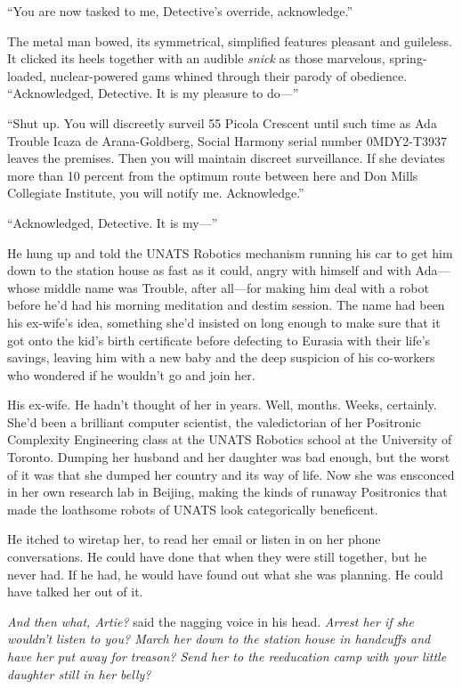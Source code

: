 “You are now tasked to me, Detective’s override, acknowledge.”

The metal man bowed, its symmetrical, simplified features pleasant
and guileless. It clicked its heels together with an audible
\emph{snick} as those marvelous, spring-loaded, nuclear-powered
gams whined through their parody of obedience. “Acknowledged,
Detective. It is my pleasure to do—”

“Shut up. You will discreetly surveil 55 Picola Crescent until such
time as Ada Trouble Icaza de Arana-Goldberg, Social Harmony serial
number 0MDY2-T3937 leaves the premises. Then you will maintain
discreet surveillance. If she deviates more than 10 percent from
the optimum route between here and Don Mills Collegiate Institute,
you will notify me. Acknowledge.”

“Acknowledged, Detective. It is my—”

He hung up and told the UNATS Robotics mechanism running his car to
get him down to the station house as fast as it could, angry with
himself and with Ada—whose middle name was Trouble, after all—for
making him deal with a robot before he’d had his morning meditation
and destim session. The name had been his ex-wife’s idea, something
she’d insisted on long enough to make sure that it got onto the
kid’s birth certificate before defecting to Eurasia with their
life’s savings, leaving him with a new baby and the deep suspicion
of his co-workers who wondered if he wouldn’t go and join her.

His ex-wife. He hadn’t thought of her in years. Well, months.
Weeks, certainly. She’d been a brilliant computer scientist, the
valedictorian of her Positronic Complexity Engineering class at the
UNATS Robotics school at the University of Toronto. Dumping her
husband and her daughter was bad enough, but the worst of it was
that she dumped her country and its way of life. Now she was
ensconced in her own research lab in Beijing, making the kinds of
runaway Positronics that made the loathsome robots of UNATS look
categorically beneficent.

He itched to wiretap her, to read her email or listen in on her
phone conversations. He could have done that when they were still
together, but he never had. If he had, he would have found out what
she was planning. He could have talked her out of it.

\emph{And then what, Artie?} said the nagging voice in his head.
\emph{Arrest her if she wouldn’t listen to you? March her down to the station house in handcuffs and have her put away for treason? Send her to the reeducation camp with your little daughter still in her belly?}

